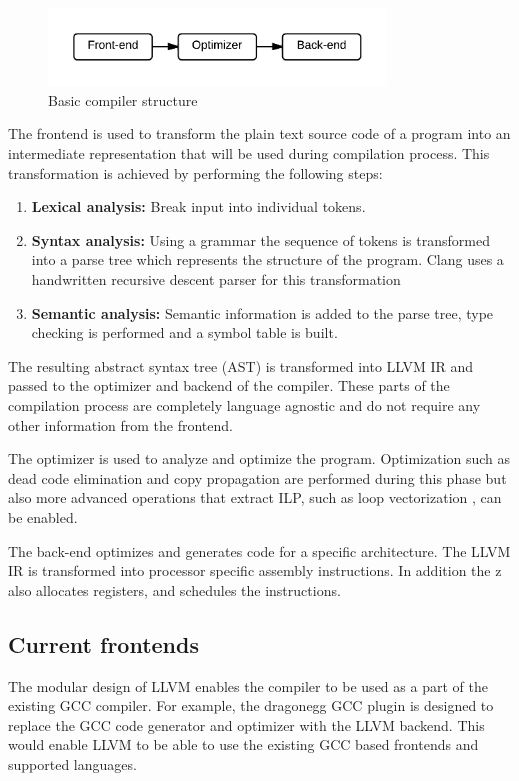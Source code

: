 
\begin{figure}[ht]
\centering
\includegraphics[width=0.8\textwidth]{2_background/img/Basic_compiler.png}
\caption{Basic compiler structure}
\label{fig:compiler_structure}
\end{figure}

The frontend is used to transform the plain text source code of a program into an intermediate representation that will be used during compilation process. This transformation is achieved by performing the following steps:

\begin{enumerate}
  \item \textbf{Lexical analysis:} Break input into individual tokens.
  \item \textbf{Syntax analysis:} Using a grammar the sequence of tokens is transformed into a parse tree which represents the structure of the program. Clang uses a handwritten recursive descent parser for this transformation
  \item \textbf{Semantic analysis:} Semantic information is added to the parse tree, type checking is performed and a symbol table is built.
\end{enumerate}

The resulting abstract syntax tree (AST) is transformed into LLVM IR and passed to the optimizer and backend of the compiler. These parts of the compilation process are completely language agnostic and do not require any other information from the frontend.

The optimizer is used to analyze and optimize the program. Optimization such as dead code elimination and copy propagation are performed during this phase but also more advanced operations that extract ILP, such as loop vectorization \cite{llvm-loop:2014}, can be enabled.

The back-end optimizes and generates code for a specific architecture. The LLVM IR is transformed into processor specific assembly instructions. In addition the z also allocates registers, and schedules the instructions.

\subsection{Current frontends}
The modular design of LLVM enables the compiler to be used as a part of the existing GCC compiler. For example, the dragonegg GCC plugin \cite{dragonegg:2014} is designed to replace the GCC code generator and optimizer with the LLVM backend. This would enable LLVM to be able to use the existing GCC based frontends and supported languages.


